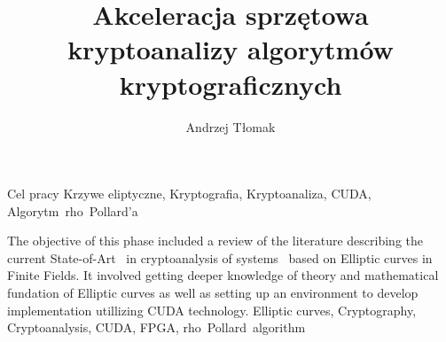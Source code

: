 \documentclass[
    left=2.5cm,         %
    right=2.5cm,        %
    top=2.5cm,          %
    bottom=3cm,         %
    bindingoffset=6mm,  %
    nohyphenation=true %
]{eiti/eiti-thesis} %
\begin{document}
\RaportThesis
{}
\title{
    Akceleracja sprzętowa kryptoanalizy algorytmów kryptograficznych
}
\author{Andrzej Tłomak}
\date{\the\year}
\maketitle

\streszczenie
Cel pracy
\slowakluczowe Krzywe eliptyczne, Kryptografia, Kryptoanaliza, CUDA, Algorytm~rho~Pollard'a

\newpage

\abstract
The objective of this phase included a review of the literature describing the current State-of-Art \
in cryptoanalysis of systems \
based on Elliptic curves in Finite Fields. It involved getting deeper knowledge of theory
and mathematical fundation of Elliptic curves as well as setting up an environment
to develop implementation utillizing CUDA technology.
\keywords Elliptic curves, Cryptography, Cryptoanalysis, CUDA, FPGA, rho~Pollard~algorithm
\newpage

\makeauthorship
\blankpage

\tableofcontents

\end{document}
